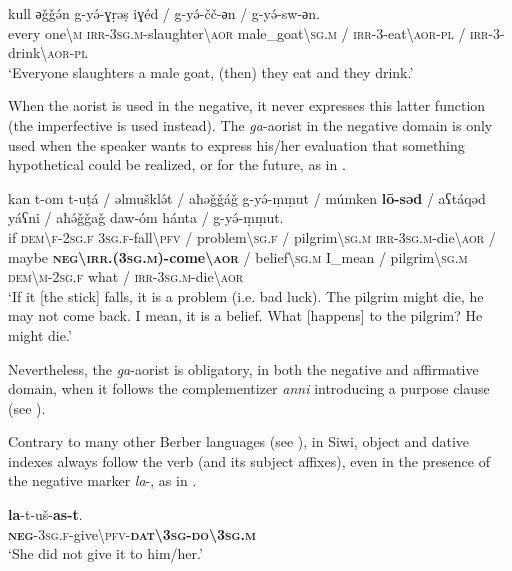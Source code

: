 \documentclass[output=paper,colorlinks,citecolor=brown]{langscibook}
\begin{document}
\ea\label{ex:siw:8}
    \gll kull әǧǧə́n g-yə́-ɣṛəṣ iɣéd / g-yə́-čč-әn / g-yə́-sw-әn.\\
         every one{\textbackslash}\textsc{m} \textsc{irr-3sg.m}{}-slaughter{\textbackslash}\textsc{aor} male\_goat{\textbackslash}\textsc{sg.m} / \textsc{irr}{}-3-eat{\textbackslash}\textsc{aor-pl} / \textsc{irr}{}-3-drink{\textbackslash}\textsc{aor-pl}  \\ 
    \glt ‘Everyone slaughters a male goat, (then) they eat and they drink.’
\z

When the aorist is used in the negative, it never expresses this latter function (the imperfective is used instead). The \textit{ga}{}-aorist in the negative domain is only used when the speaker wants to express his/her evaluation that something hypothetical could be realized, or for the future, as in .



\ea\label{ex:siw:9}
    \gll kan t-om t-uṭ\'{a} / əlmuškl\'{ə}t / aħəǧǧáǧ g-y\'{ə}-ṃṃut / múmken \textbf{lō-səd} / aʕtáqəd yáʕni / aħ\'{ə}ǧǧaǧ daw-óm hánta / g-y\'{ə}-ṃṃut.\\
         if \textsc{dem{\textbackslash}f-2sg.f} \textsc{3sg.f}{}-fall{\textbackslash}\textsc{pfv} / problem{\textbackslash}\textsc{sg.f} / pilgrim{\textbackslash}\textsc{sg.m} \textsc{irr-3sg.m}-die{\textbackslash}\textsc{aor} / maybe \textbf{\textsc{neg{\textbackslash}irr.(3sg.m)}-come{\textbackslash}\textsc{aor}} / belief{\textbackslash}\textsc{sg.m} I\_mean / pilgrim{\textbackslash}\textsc{sg.m} \textsc{dem{\textbackslash}m-2sg.f} what / \textsc{irr-3sg.m}{}-die{\textbackslash}\textsc{aor}\\
    \glt‘If it [the stick] falls, it is a problem (i.e. bad luck). The pilgrim might die, he may not come back. I mean, it is a belief. What [happens] to the pilgrim? He might die.’
\z

Nevertheless, the \textit{ga}{}-aorist is obligatory, in both the negative and affirmative domain, when it follows the complementizer \textit{anni} introducing a purpose clause (see ). 

Contrary to many other Berber languages (see ), in Siwi, object and dative indexes always follow the verb (and its subject affixes), even in the presence of the negative marker \textit{la}{}-, as in .

\ea\label{ex:siw:10}
    \gll \textbf{la}-t-uš-\textbf{as-t}.\\
         \textsc{\textbf{neg}-3sg.f}-give\textbackslash\textsc{pfv-\textbf{dat\textbackslash3sg-do\textbackslash3sg.m}}\\
    \glt ‘She did not give it to him/her.’
\z
\end{document}
